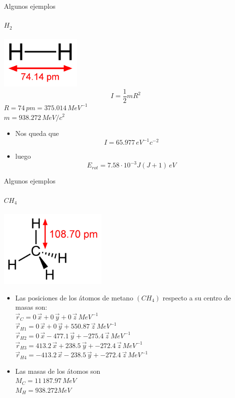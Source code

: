 \documentclass[a4paper]{beamer}
\begin{document}
\begin{frame}{Algunos ejemplos}
\framesubtitle{$H_2$}
\includegraphics[width=0.3\textwidth]{hidrogeno.png}\\
$$I=\frac{1}{2}mR^2$$
 $R=74 \, pm=375.014 \, MeV^{-1}$\\
 $m=938.272 \, MeV/c^2$\\
 \begin{itemize}
  \item Nos queda que 
 $$I=65.977 \, eV^{-1}c^{-2}$$
\item luego 
 $$E_{rot} = 7.58\cdot 10^{-3}J(J+1)\, eV$$
 \end{itemize}
\end{frame}

\begin{frame}{Algunos ejemplos}
\framesubtitle{$CH_4$}
\includegraphics[width=0.4\textwidth]{metano.png}\\
\begin{itemize}
\item Las posiciones de los átomos  de metano $(CH_4)$ respecto a su centro de masas son:\\
 $\vec r_C = 0\, \vec x + 0 \, \vec y + 0 \, \vec z \, MeV^{-1}$\\
 $\vec r_{H1} = 0\, \vec x+0 \, \vec y + 550.87 \, \vec z \, MeV^{-1}$\\
 $\vec r_{H2} = 0\, \vec x -477.1 \, \vec y + -275.4\, \vec z \, MeV^{-1}$\\
 $\vec r_{H3} = 413.2\, \vec x + 238.5 \, \vec y + -272.4 \, \vec z \, MeV^{-1}$\\
 $\vec r_{H4} = -413.2 \, \vec x -238.5 \, \vec y + -272.4 \, \vec z \, MeV^{-1}$\\
 
\item Las masas de los átomos son\\
 $M_C = 11\, 187.97 \, MeV$\\
 $M_H = 938.272 MeV$\\
\end{itemize}
\end{frame}
\end{document}
